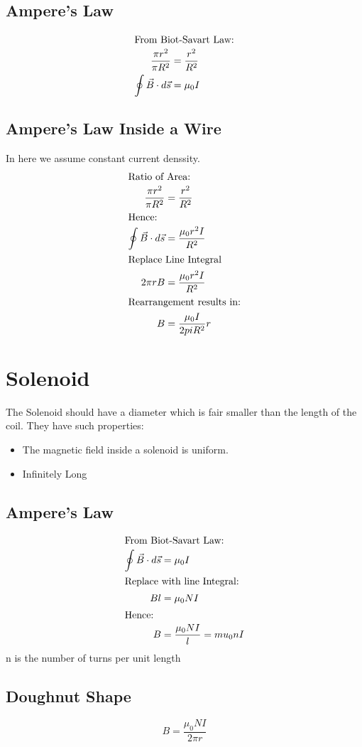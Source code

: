 \documentclass[12pt]{article}
\numberwithin{equation}{section}
\begin{document}
\subsection{Ampere's Law}
\begin{align}
  \intertext{From Biot-Savart Law:}
  \frac{\pi r^2}{\pi R^2} &= \frac{r^2}{R^2} \\
\oint \vec{B} \cdot d \vec{s}&= \mu_0 I
\end{align}
\subsection{Ampere's Law Inside a Wire}
In here we assume constant current denssity.
\begin{align}
  \intertext{Ratio of Area:}
  \frac{\pi r^2}{\pi R^2} &= \frac{r^2}{R^2} \\
  \intertext{Hence:}
  \oint \vec{B} \cdot d \vec{s}&= \frac{\mu_0 r^2 I}{R^2} \\
  \intertext{Replace Line Integral}
  2 \pi r B &= \frac{\mu_0 r^2 I}{R^2}\\
  \intertext{Rearrangement results in:}
  B&= \frac{\mu_0 I}{2pi R^2} r
\end{align}
\section{Solenoid}
The Solenoid should have a diameter which is fair smaller than the length of the coil.
They have such properties:
\begin{itemize}
\item The magnetic field inside a solenoid is uniform.
\item Infinitely Long
\end{itemize}
\pagebreak
\subsection{Ampere's Law}
\begin{align}
  \intertext{From Biot-Savart Law:}
 \oint \vec{B} \cdot d \vec{s}&= \mu_0 I\\
\intertext{Replace with line Integral:}
Bl&=\mu_0 N I\\
\intertext{Hence:}
B&= \frac{\mu_0 N I}{l} = mu_0 n I
\end{align}
n is the number of turns per unit length
 
\subsection{Doughnut Shape}
\begin{equation}
B= \frac{\mu_0 N I}{2 \pi r }
\end{equation}
\end{document}
